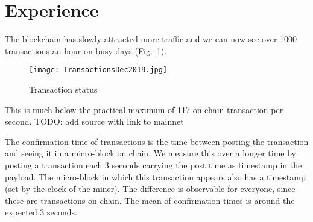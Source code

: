 \section{Experience}
\label{sect:results}



The blockchain has slowly attracted more traffic and we can now see over 1000
transactions an hour on busy days (Fig.\ \ref{txs-nrs}).
\begin{figure}[h]
   \texttt{[image: TransactionsDec2019.jpg]}
   \caption{Transaction status}
   \label{txs-nrs}
\end{figure}
This is much below the practical maximum of 117 on-chain transaction per
second. TODO: add source with link to mainnet

The confirmation time of transactions is the time between posting the
transaction and seeing it in a micro-block on chain. We measure this over a
longer time by posting a transaction each 3 seconds carrying the post time as
timestamp in the payload. The micro-block in which this transaction appears
also has a timestamp (set by the clock of the miner). The difference is
observable for everyone, since these are transactions on chain. The mean of
confirmation times is around the expected 3 seconds.


